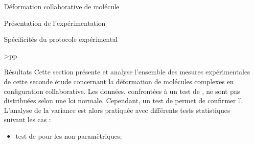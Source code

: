 \documentclass[myfrancais]{mythesis}
\begin{document}
\begin{mychapter}{Déformation collaborative de molécule}
\begin{mysection}{Présentation de l'expérimentation}
\begin{mysubsection}{Spécificités du protocole expérimental}
\begin{mytable}
\begin{mytabular}{>{\bfseries}p{\exptwofirstcolumn}p{\exptwosecondcolumn}}
						\mymiddlerule[\heavyrulewidth]
						 \\
						\mybottomrule
					\end{mytabular}
				\end{mytable}
			\end{mysubsection}
		\end{mysection}
		\begin{mysection}{Résultats}
			Cette section présente et analyse l'ensemble des mesures expérimentales de cette seconde étude concernant la déformation de molécules complexes en configuration collaborative.
			Les données, confrontées à un test de , ne sont pas distribuées selon une loi normale.
			Cependant, un test de  permet de confirmer l'.
			L'analyse de la variance est alors pratiquée avec différents tests statistiques suivant les cas :
			\begin{itemize}
				\item test de  pour les  non-paramètriques;

\end{itemize}
\end{mysection}
\end{mychapter}
\end{document}
